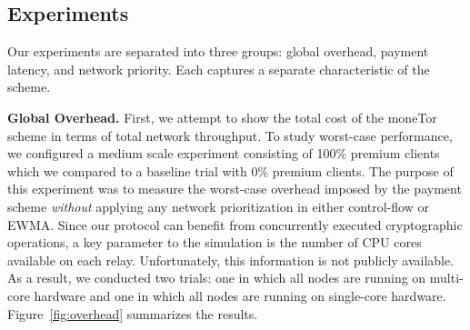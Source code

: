 \subsection{Experiments}

\label{subsec:experiments} Our experiments are separated into three groups: global overhead, payment latency, and network priority.
Each captures a separate characteristic of the scheme.

\medskip \noindent \textbf{Global Overhead.}
First, we attempt to show the total cost of the moneTor scheme in terms of total network throughput.
To study worst-case performance, we configured a medium scale experiment consisting of 100\% premium clients which we compared to a baseline trial with 0\% premium clients.
The purpose of this experiment was to measure the worst-case overhead imposed by the payment scheme \emph{without} applying any network prioritization in either control-flow or EWMA.
Since our protocol can benefit from concurrently executed cryptographic operations, a key parameter to the simulation is the number of CPU cores available on each relay.
Unfortunately, this information is not publicly available.
As a result, we conducted two trials: one in which all nodes are running on multi-core hardware and one in which all nodes are running on single-core hardware.
Figure~\ref{fig:overhead} summarizes the results.

